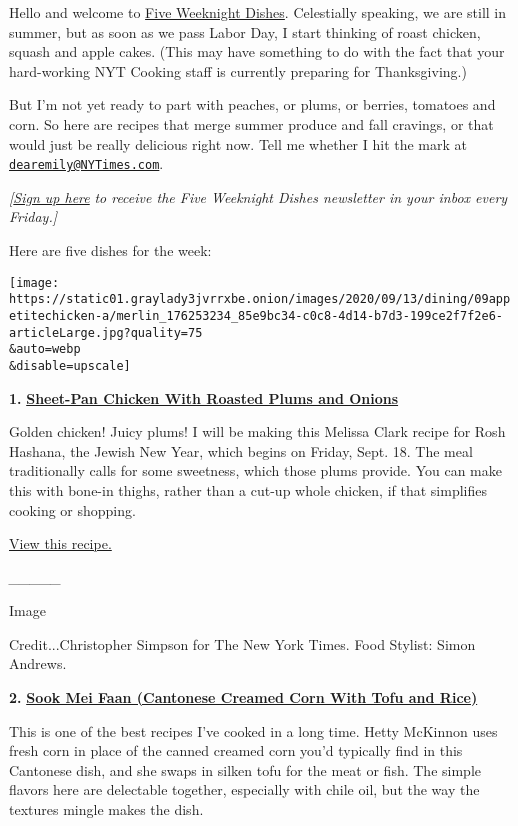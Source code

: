 Hello and welcome to
\href{https://www.nytimes3xbfgragh.onion/column/five-weeknight-dishes}{Five
Weeknight Dishes}. Celestially speaking, we are still in summer, but as
soon as we pass Labor Day, I start thinking of roast chicken, squash and
apple cakes. (This may have something to do with the fact that your
hard-working NYT Cooking staff is currently preparing for Thanksgiving.)

But I'm not yet ready to part with peaches, or plums, or berries,
tomatoes and corn. So here are recipes that merge summer produce and
fall cravings, or that would just be really delicious right now. Tell me
whether I hit the mark at
\href{mailto:dearemily@NYTimes.com}{\nolinkurl{dearemily@NYTimes.com}}.

\emph{{[}\href{https://www.nytimes3xbfgragh.onion/newsletters/five-weeknight-dishes?module=inline}{Sign
up here}} \emph{to receive the Five Weeknight Dishes newsletter in your
inbox every Friday.{]}}

Here are five dishes for the week:

\texttt{[image: https://static01.graylady3jvrrxbe.onion/images/2020/09/13/dining/09appetitechicken-a/merlin\_176253234\_85e9bc34-c0c8-4d14-b7d3-199ce2f7f2e6-articleLarge.jpg?quality=75\\\&auto=webp\\\&disable=upscale]}

\textbf{1.}
\href{https://cooking.nytimes3xbfgragh.onion/recipes/1021408-sheet-pan-chicken-with-roasted-plums-and-onions}{\textbf{Sheet-Pan
Chicken With Roasted Plums and Onions}}

Golden chicken! Juicy plums! I will be making this Melissa Clark recipe
for Rosh Hashana, the Jewish New Year, which begins on Friday, Sept. 18.
The meal traditionally calls for some sweetness, which those plums
provide. You can make this with bone-in thighs, rather than a cut-up
whole chicken, if that simplifies cooking or shopping.

\href{https://cooking.nytimes3xbfgragh.onion/recipes/1021408-sheet-pan-chicken-with-roasted-plums-and-onions}{View
this recipe.}

\emph{\_\_\_\_\_}

Image

Credit...Christopher Simpson for The New York Times. Food Stylist: Simon
Andrews.

\textbf{2.}
\href{https://cooking.nytimes3xbfgragh.onion/recipes/1021337-sook-mei-faan-cantonese-creamed-corn-with-tofu-and-rice}{\textbf{Sook
Mei Faan (Cantonese Creamed Corn With Tofu and Rice)}}

This is one of the best recipes I've cooked in a long time. Hetty
McKinnon uses fresh corn in place of the canned creamed corn you'd
typically find in this Cantonese dish, and she swaps in silken tofu for
the meat or fish. The simple flavors here are delectable together,
especially with chile oil, but the way the textures mingle makes the
dish.

